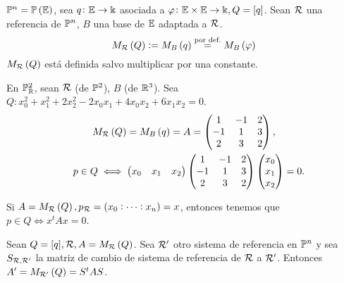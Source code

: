 \begin{defi}
    $\mathbb{P}^n = \mathbb{P}\left(\mathbb{E}\right)$, sea $q \colon \mathbb{E} \to \Bbbk$ asociada a $\varphi \colon \mathbb{E} \times \mathbb{E} \to \Bbbk, Q = [q]$. Sean $\mathcal{R}$ una referencia de $\mathbb{P}^n$, $B$ una base de $\mathbb{E}$ adaptada a $\mathcal{R}$.
    \[ M_{\mathcal{R}} \left( Q\right) := M_B\left( q\right) \stackrel{\text{por def.}}{=} M_B\left(\varphi\right) \]
    $M_{\mathcal{R}}\left( Q\right)$ está definida salvo multiplicar por una constante.
\end{defi}
\begin{example}
    En $\mathbb{P}^2_{\mathbb{R}}$, sean $\mathcal{R}$ (de $\mathbb{P}^2$), $B$ (de $\mathbb{R}^3$). Sea $Q\colon x_0^2+ x_1^2+2x_2^2-2x_0x_1+4x_0x_2 + 6x_1x_2 = 0$.
    \begin{gather*}
        M_{\mathcal{R}}\left( Q\right) = M_B\left( q\right) = A =
        \begin{pmatrix}
            1 & -1 & 2 \\
            -1 & 1 & 3 \\
            2 & 3 & 2 \\
        \end{pmatrix}, \\
        \quad p\in Q \iff
        \begin{pmatrix}
            x_0 & x_1 & x_2 \\
        \end{pmatrix}
        \begin{pmatrix}
            1 & -1 & 2 \\
            -1 & 1 & 3 \\
            2 & 3 & 2 \\
        \end{pmatrix}
        \begin{pmatrix}
            x_0 \\
            x_1 \\
            x_2 \\
        \end{pmatrix}
        = 0.
    \end{gather*}
\end{example}
\begin{obs}
    Si $A = M_{\mathcal{R}}\left( Q\right), p_{\mathcal{R}} = \left( x_0:\dots:x_n\right) = x$, entonces tenemos que $p\in Q \iff x^tAx = 0$.
\end{obs}
\begin{example}
    Sean $Q = [q], \mathcal{R}, A = M_{\mathcal{R}}\left( Q\right)$. Sea $\mathcal{R}'$ otro sistema de referencia en $\mathbb{P}^n$ y sea $S_{\mathcal{R}, \mathcal{R}'}$ la matriz de cambio de sistema de referencia de $\mathcal{R}$ a $\mathcal{R}'$. Entonces $A' = M_{\mathcal{R}'}\left( Q\right) = S^tAS$.
\end{example}

